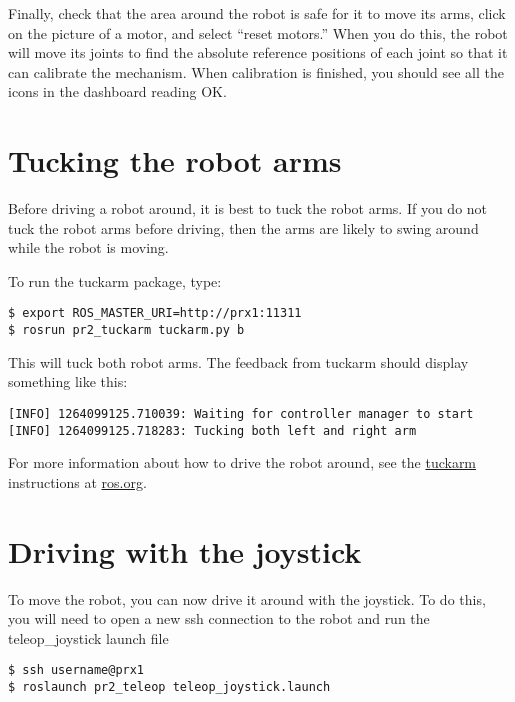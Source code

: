 Finally, check that the area around the robot is safe for it to move its arms, click on the picture of a motor, and 
select ``reset motors.''  When you do this, the robot will move its joints to find the absolute reference positions of 
each joint so that it can calibrate the mechanism.  When calibration is finished, you should see all the icons in the 
dashboard reading OK.

\section{Tucking the robot arms}

Before driving a robot around, it is best to tuck the robot arms. If you do not tuck the robot arms before driving, then the arms are likely to swing around while the robot is moving.

To run the tuckarm package, type:
\begin{verbatim}
$ export ROS_MASTER_URI=http://prx1:11311
$ rosrun pr2_tuckarm tuckarm.py b
\end{verbatim}
This will tuck both robot arms. The feedback from tuckarm should display something like this:
\begin{verbatim}
[INFO] 1264099125.710039: Waiting for controller manager to start
[INFO] 1264099125.718283: Tucking both left and right arm
\end{verbatim}

For more information about how to drive the robot around, see the 
\href{http://www.ros.org/wiki/pr2_tuckarm}{tuckarm} instructions at \href{http://www.ros.org}{ros.org}.

\section{Driving with the joystick}
To move the robot, you can now drive it around with the joystick.  To do this, you will need to open a new ssh connection 
to the robot and run the teleop\_joystick launch file
\begin{verbatim}
$ ssh username@prx1
$ roslaunch pr2_teleop teleop_joystick.launch 
\end{verbatim}

